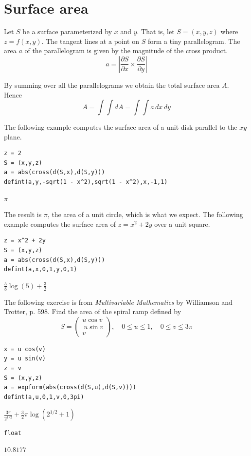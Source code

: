 
\newpage

\section{Surface area}

Let $S$ be a surface parameterized by $x$ and $y$.
That is, let $S=(x,y,z)$ where $z=f(x,y)$.
The tangent lines at a point on $S$ form a tiny parallelogram.
The area $a$ of the parallelogram is given by the magnitude of the cross product.
\begin{equation*}
a=\left|\frac{\partial S}{\partial x}\times\frac{\partial S}{\partial y}\right|
\end{equation*}

By summing over all the parallelograms we obtain the total surface area $A$.
Hence
\begin{equation*}
A=\int\int dA=\int\int a\,dx\,dy
\end{equation*}

The following example computes the surface area of a unit disk
parallel to the $xy$ plane.

{\color{blue}
\begin{verbatim}
z = 2
S = (x,y,z)
a = abs(cross(d(S,x),d(S,y)))
defint(a,y,-sqrt(1 - x^2),sqrt(1 - x^2),x,-1,1)
\end{verbatim}
}

$\displaystyle \pi$

\bigskip
The result is $\pi$, the area of a unit circle, which is what we expect.
The following example computes the surface area of $z=x^2+2y$ over
a unit square.

{\color{blue}
\begin{verbatim}
z = x^2 + 2y
S = (x,y,z)
a = abs(cross(d(S,x),d(S,y)))
defint(a,x,0,1,y,0,1)
\end{verbatim}
}

$\displaystyle \tfrac{5}{8}\log(5)+\tfrac{3}{2}$

\bigskip
The following exercise is from
{\it Multivariable Mathematics} by Williamson and Trotter, p. 598.
Find the area of the spiral ramp defined by
\begin{equation*}
S=\begin{pmatrix}u\cos v\\\ u\sin v\\ v\end{pmatrix},\quad 0\le u\le1,\quad 0\le v\le3\pi
\end{equation*}

{\color{blue}
\begin{verbatim}
x = u cos(v)
y = u sin(v)
z = v
S = (x,y,z)
a = expform(abs(cross(d(S,u),d(S,v))))
defint(a,u,0,1,v,0,3pi)
\end{verbatim}
}

$\displaystyle \frac{3\pi}{2^{1/2}}+\tfrac{3}{2}\pi\log\left(2^{1/2}+1\right)$

{\color{blue}
\begin{verbatim}
float
\end{verbatim}
}

$\displaystyle 10.8177$


